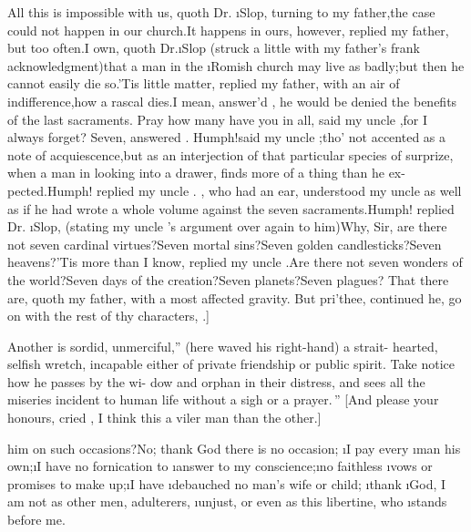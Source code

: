 \documentclass[twoside]{article}
\begin{document}
All this is impossible with us, quoth Dr.\@
\i{Slop}, turning to my father,\tsk the case could
not happen in our church.\tsh It\break
happens in ours,
however, replied my father, but too often.\tsh I own,
quoth Dr.\break \i{Slop} (struck a little with my
father’s
frank acknowledgment)\tsk that a man in the
\i{Romish} church may live as badly;\tsk\break but
then he cannot easily die so.\tsh ’Tis little matter,
replied my father, with an air of indifference,\tsk how
a rascal dies.\tsk\break I mean, answer’d \drslop,
he would be denied the benefits of the last
sacraments.\break
\tsk Pray how many have you in all, said my uncle
\toby,\tsk for I always forget?\tsk\break
Seven, answered \drslop.\tsk
Humph!\tsk\break said my
uncle \toby;\tsk tho’ not accented as a note of
acquiescence,\tsk but as an interjection of that
particular species of surprize, when a man in looking
into a drawer, finds more of a thing than he
ex-\break pected.\tsk Humph! replied my uncle \toby.
\drslop, who had an ear, understood my uncle
\toby as well as if he had wrote a whole volume
against the seven sacraments.\tsh Humph! replied Dr.\@
\i{Slop}, (stating my uncle \toby's
argument over
again to him)\tsh Why, Sir, are there not
seven cardinal virtues?\tsh Seven mortal sins?\tsh Seven
golden candlesticks?\tsh Seven heavens?\tsh ’Tis\break
more than I know, replied my uncle\break
\toby.\tsh Are
there not seven wonders of the world?\tsh Seven days of
the creation?\tsh Seven planets?\tsh Seven plagues?\tsh
That there are, quoth my father, with a most affected
gravity. But pri’thee, continued he, go on with the rest
of thy characters, \trim.]

\lqq Another is sordid, unmerciful,” (here\break
\trim waved his right-hand) \lqq a strait-\break
\lqq hearted, selfish wretch, incapable either\break
\lqq of private friendship or public spirit.\break
\lqq Take notice how he passes by the wi-\break
\lqq dow and orphan in their distress, and\break
\lqq sees all the miseries incident to human\break
\lqq life without a sigh or a prayer.\,” [And
please your honours, cried
\trim, I think this a viler man than the other.]

\lqq {}\break
\lqq him on such occasions?\tsh No; thank\break
\lqq God there is no occasion; \i{I pay every}\break
\lqq \i{man his own};\i{\tsk I have no fornication to}\break
\lqq \i{answer to my conscience};\i{\tsk no faithless}\break
\lqq \i{vows or promises to make up};\i{\tsk I have}\break
\lqq \i{debauched no man’s wife or child}; \i{thank}\break
\lqq \i{God, I am not as other men, adulterers,}\break
\lqq \i{unjust, or even as this libertine, who}\break
\lqq \i{stands before me.}
\end{document}
